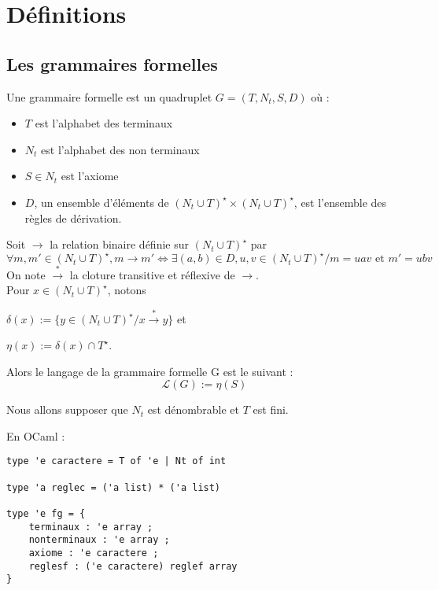 \documentclass[a4paper,10pt
]{article}
\title{\letitle}
\author{\leauthor}
\date{}
\begin{document}
    
\maketitle
\tableofcontents

\section{Définitions}

\subsection{Les grammaires formelles}

Une grammaire formelle est un quadruplet $G = (T,N_t,S,D)$ où :

\begin{itemize}
\item $T$ est l'alphabet des terminaux
\item $N_t$ est l'alphabet des non terminaux
\item $S \in N_t$ est l'axiome
\item $D$, un ensemble d'éléments de $(N_t \cup T)^\star \times (N_t \cup T)^\star$, est l'ensemble des règles de dérivation.
\end{itemize}

Soit $\rightarrow$ la relation binaire définie sur $(N_t \cup T)^\star$ par
\begin{equation}
\forall m,m' \in (N_t \cup T)^\star, m \rightarrow m' \iff \exists (a,b) \in D, u,v \in (N_t \cup T)^\star / m = uav \text{ et } m' = ubv
\end{equation}
On note $\overset{*}{\rightarrow}$ la cloture transitive et réflexive de $\rightarrow$.\\
Pour $x \in (N_t \cup T)^\star$, notons

$\delta(x) := \{y \in (N_t \cup T)^\star / x \overset{*}{\rightarrow} y\}$
et 

$\eta(x) := \delta(x) \cap T^\star$.

Alors le langage de la grammaire formelle  G est le suivant :
\begin{equation*}\mathcal{L} (G) := \eta(S)\end{equation*}

Nous allons supposer que $N_t$ est dénombrable et $T$ est fini.

En OCaml :
\begin{verbatim}
type 'e caractere = T of 'e | Nt of int

type 'a reglec = ('a list) * ('a list)

type 'e fg = {
    terminaux : 'e array ;
    nonterminaux : 'e array ;
    axiome : 'e caractere ;
    reglesf : ('e caractere) reglef array 
}
\end{verbatim}
\end{document}
